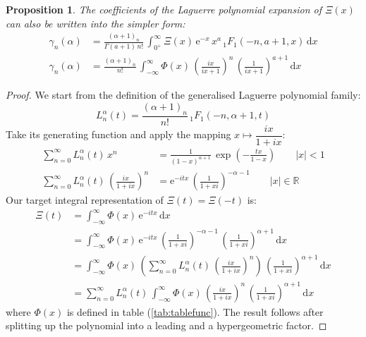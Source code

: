 \documentclass[a4paper,11pt,twoside]{amsart}
\newtheorem{proposition}[theorem]{Proposition}
\newcommand{\verifiedeq}{=}
\newcommand{\defeq}{=}
\newcommand{\verifiedeq}{\stackrel{\checkmark}{=}}
\newcommand{\defeq}{\stackrel{\scriptscriptstyle \textnormal{def}}{=}}
\begin{document}
\begin{proposition}
The coefficients of the Laguerre polynomial expansion of $\Xi(x)$ can also be written into the simpler form: 
\begin{align}
\gamma_n(\alpha) &\verifiedeq \frac{(\alpha+1)_n}{\Gamma(a+1)\,n!}\,\int_{0^+}^{\infty} \Xi(x)\,\mathrm{e}^{-x}\,x^a\,{}_1F_1(-n,a+1,x)\,\mathrm{d}x \\
\gamma_n(\alpha) &\verifiedeq \frac{(\alpha+1)_n}{n!}\,\int_{-\infty}^{\infty} \Phi(x)\,\left(\frac{ix}{ix+1}\right)^n\,\left(\frac{1}{ix+1}\right)^{a+1}\,\mathrm{d}x
\end{align}
\end{proposition}
\begin{proof}
We start from the definition of the generalised Laguerre polynomial family:
\begin{equation}
 L^{\alpha}_n(t) \defeq \frac{(\alpha+1)_n}{n!}\, {}_1F_1(-n, \alpha+1,t) 
\end{equation}
Take its generating function and apply the mapping $x \mapsto \dfrac{ix}{1+ix}$:
\begin{align}
 \sum_{n=0}^\infty L^{\alpha}_n(t)\, x^n &\verifiedeq \frac{1}{(1-x)^{\alpha+1}}\,\exp\left(-\frac{tx}{1-x}\right) \qquad |x| < 1 \\
 \sum_{n=0}^\infty L^{\alpha}_n(t)\,\left(\frac{ix}{1+ix}\right)^n &\verifiedeq \textrm{e}^{-itx}\,\left(\frac{1}{1+xi} \right)^{-\alpha-1} \qquad |x| \in \mathbb{R}
\end{align}
Our target integral representation of $\Xi(t) = \Xi(-t)$ is:
\begin{align}
 \Xi(t) &\verifiedeq \int_{-\infty}^\infty \Phi(x)\,\textrm{e}^{-itx}\, \mathrm{d}x \\
 & \verifiedeq \int_{-\infty}^\infty \Phi(x)\,\textrm{e}^{-itx}\,\left(\frac{1}{1+xi} \right)^{-\alpha-1}\,\left(\frac{1}{1+xi} \right)^{\alpha+1} \, \mathrm{d}x \\
 & \verifiedeq \int_{-\infty}^\infty \Phi(x)\,\left( \sum_{n=0}^\infty L^{\alpha}_n(t)\,\left(\frac{ix}{1+ix}\right)^n\right)\,\left(\frac{1}{1+xi} \right)^{\alpha+1} \, \mathrm{d}x \\
  &\verifiedeq \sum_{n=0}^\infty L^{\alpha}_n(t)\,\int_{-\infty}^\infty \Phi(x)\,\left(\frac{ix}{1+ix}\right)^n\,\left(\frac{1}{1+xi} \right)^{\alpha+1}\, \mathrm{d}x
\end{align}
where $\Phi(x)$ is defined in table (\ref{tab:tablefunc}). The result follows after splitting up the polynomial into a leading and a hypergeometric factor.
\end{proof}
\end{document}
